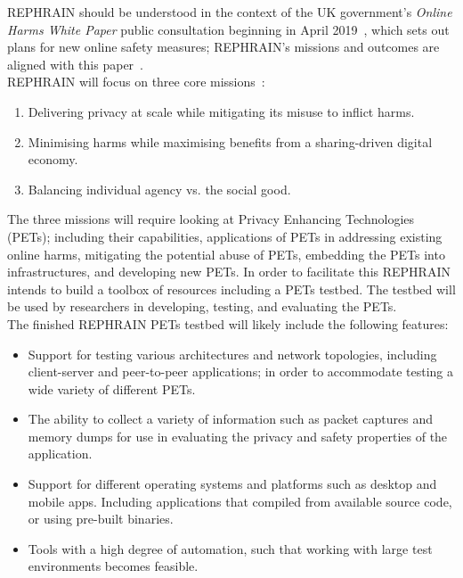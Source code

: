 \documentclass[
    author={Jacob Daniel Halsey},
    supervisor={Prof. Awais Rashid},
    degree={BSc},
    title={Building a Testbed for Evaluating Privacy Enhancing Technologies  (PETs)},
    subtitle={},
    type={software development},
    year={2021}
]{dissertation}
\begin{document}
REPHRAIN should be understood in the context of the UK government's \emph{Online Harms White Paper} public
consultation beginning in April 2019~\cite{uk_gov_online_harms}, which sets out plans for new online safety 
measures; REPHRAIN's missions and outcomes are aligned with this paper~\cite{rephrain_harms}. \\

REPHRAIN will focus on three core missions~\cite{rephrain_missions}:

\begin{enumerate}
	\item Delivering privacy at scale while mitigating its misuse to inflict harms.
	\item Minimising harms while maximising benefits from a sharing-driven digital economy.
	\item Balancing individual agency vs. the social good.
\end{enumerate}

The three missions will require looking at Privacy Enhancing Technologies (PETs); including their capabilities,
applications of PETs in addressing existing online harms, mitigating the potential abuse of PETs, embedding the PETs
into infrastructures, and developing new PETs.
In order to facilitate this REPHRAIN intends to build a toolbox of resources including a PETs testbed. The testbed
will be used by researchers in developing, testing, and evaluating the PETs.\\

The finished REPHRAIN PETs testbed will likely include the following features:

\begin{itemize}
	\item Support for testing various architectures and network topologies, 
	including client-server and peer-to-peer applications; in order to accommodate 
	testing a wide variety of different PETs.
	\item The ability to collect a variety of information such as packet captures and memory dumps
	for use in evaluating the privacy and safety properties of the application.
	\item Support for different operating systems and platforms such as desktop and mobile apps.
	Including applications that compiled from available source code, or using pre-built binaries.
	\item Tools with a high degree of automation, such that working with large test
	environments becomes feasible.
\end{itemize}
\end{document}
